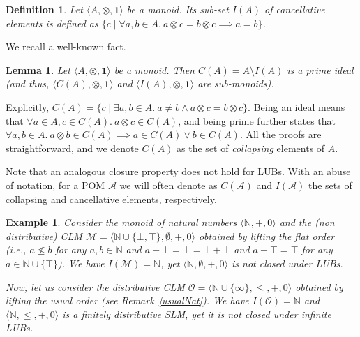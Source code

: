 \documentclass[a4paper]{elsarticle}
\newtheorem{definition}{Definition}
\newtheorem{example}{Example}
\newtheorem{lemma}{Lemma}
\newcommand{\monop}{\otimes}
\newcommand{\1}{\mathbf{1}}
\begin{document}
\begin{definition}
	Let $\langle A, \monop, \1 \rangle$ be a monoid. Its sub-set $I(A)$ 
	of \emph{cancellative} elements is defined as 
	$\{ c \mid \forall a, b \in A.\ a \otimes c = b \otimes c \implies a = b \}$.
\end{definition}

We  recall a well-known fact.

\begin{lemma}
	\label{ideal}
	Let $\langle A, \monop, \1 \rangle$ be a monoid.
	Then $C(A) = A\setminus I(A)$ is
	a prime ideal (and thus, $\langle C(A), \monop, \1 \rangle$
	and $\langle I(A), \monop, \1 \rangle$ are sub-monoids).
\end{lemma}

Explicitly, $C(A) = \{ c \mid \exists a, b \in A.\ a \neq b \wedge a \otimes c = b \otimes c\}$.
%
Being an ideal means that $\forall a \in A, c \in C( A).\ a \otimes c \in C(A)$,
and being prime further states that 
$\forall a, b \in A.\ a\otimes b \in C( A) \implies a \in C(A) \vee b \in C(A)$.
%
All the proofs are straightforward, and we denote $C(A)$ as the set of \emph{collapsing} 
elements of $A$. 

Note that an analogous closure property does not hold for LUBs. With an abuse of notation,
for a POM $\mathcal{A}$ we will often denote as $C(\mathcal{A})$ and $I(\mathcal{A})$ the 
sets of collapsing and cancellative elements, respectively.

\begin{example}\label{flat}
	Consider
	the monoid of natural numbers $\langle \mathbb N, +, 0 \rangle$ and 
	the (non distributive) CLM $\mathcal{M} = \langle \mathbb{N} \cup \{\bot,\top\}, \emptyset, +, 0\rangle$ 
	obtained by lifting the flat order (i.e., $a \not \leq b$ for any $a, b \in \mathbb N$ and 
	$a + \bot = \bot = \bot + \bot$ and $a + \top = \top$  for any $a \in \mathbb N \cup \{\top\}$).
	We have $I(\mathcal{M}) =  \mathbb{N}$, yet $\langle \mathbb N, \emptyset, +, 0\rangle$ is not closed under LUBs. 
	
	Now, let us consider the distributive CLM
	$\mathcal{O} = \langle \mathbb N \cup \{\infty\}, \leq, +, 0\rangle$ 
	obtained by lifting the usual order (see Remark~\ref{usualNat}).
	We have $I(\mathcal{O}) = \mathbb{N}$ and $\langle \mathbb N, \leq, +, 0\rangle$ is a finitely distributive SLM, yet
	it is not closed under infinite LUBs.
\end{example}
\end{document}
